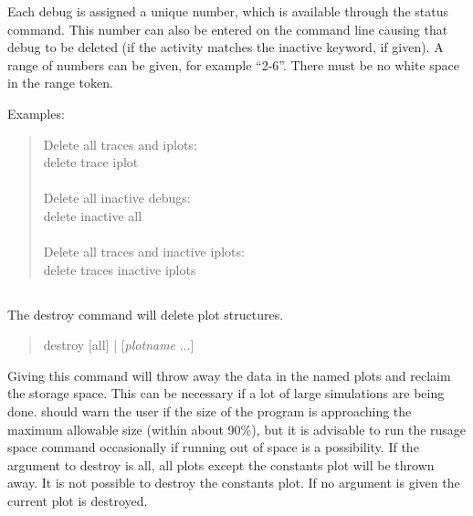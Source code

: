 Each debug is assigned a unique number, which is available through
the {\cb status} command.  This number can also be entered on the
command line causing that debug to be deleted (if the activity
matches the {\vt inactive} keyword, if given).  A range of numbers
can be given, for example ``2-6''.  There must be no white space in
the range token.

Examples:
\begin{quote}
Delete all traces and iplots:\\
{\vt delete trace iplot}\\
\\
Delete all inactive debugs:\\
{\vt delete inactive all}\\
\\
Delete all traces and inactive iplots:\\
{\vt delete traces inactive iplots}
\end{quote}

\subsection{}


The {\cb destroy} command will delete plot structures.
\begin{quote}\vt
destroy [all] | [{\it plotname} ...]
\end{quote}
Giving this command will throw away the data in the named plots and
reclaim the storage space.  This can be necessary if a lot of large
simulations are being done.  {\WRspice} should warn the user if the
size of the program is approaching the maximum allowable size (within
about 90\%), but it is advisable to run the {\vt rusage space} command
occasionally if running out of space is a possibility.  If the
argument to {\cb destroy} is {\vt all}, all plots except the constants
plot will be thrown away.  It is not possible to destroy the constants
plot.  If no argument is given the current plot is destroyed.

\subsection{}


